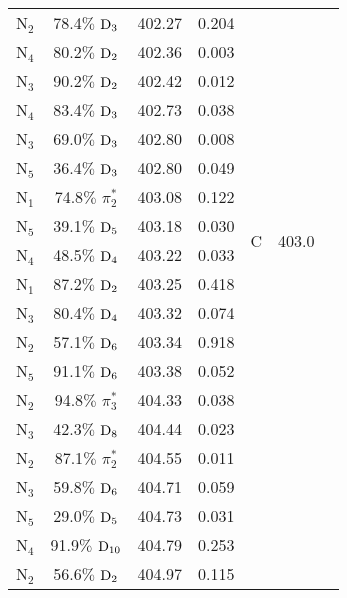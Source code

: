\documentclass[12pt]{article}
\begin{document}
\begin{table}[!h]
\begin{tabular}{c@{\hskip 0.22in}c@{\hskip 0.22in}c@{\hskip 0.22in}c@{\hskip 0.52in}c@{\hskip 0.22in}c@{\hskip 0.22in}c}
    N$_2$
 &   78.4$\%$ $\rm D_3$  & 402.27 & 0.204 \\
    N$_4$
 &   80.2$\%$ $\rm D_2$  & 402.36 & 0.003 \\
    N$_3$
 &   90.2$\%$ $\rm D_2$  & 402.42 & 0.012 
 \vspace{0.1in}\\
    N$_4$
 &   83.4$\%$ $\rm D_3$  & 402.73 & 0.038 & \multirow{10}{*}{C} & \multirow{10}{*}{403.0}\\
    N$_3$
 &   69.0$\%$ $\rm D_3$  & 402.80 & 0.008 \\
    N$_5$
 &   36.4$\%$ $\rm D_3$  & 402.80 & 0.049 \\
    N$_1$
 &   74.8$\%$ $\pi_2^*$  & 403.08 & 0.122 \\
    N$_5$
 &   39.1$\%$ $\rm D_5$  & 403.18 & 0.030 \\
    N$_4$
 &   48.5$\%$ $\rm D_4$  & 403.22 & 0.033 \\
    N$_1$
 &   87.2$\%$ $\rm D_2$  & 403.25 & 0.418 \\
    N$_3$
 &   80.4$\%$ $\rm D_4$  & 403.32 & 0.074 \\
    N$_2$
 &   57.1$\%$ $\rm D_6$  & 403.34 & 0.918 \\
    N$_5$
 &   91.1$\%$ $\rm D_6$  & 403.38 & 0.052 
 \vspace{0.1in}\\
    N$_2$
 &   94.8$\%$ $\pi_3^*$  & 404.33 & 0.038 \\
    N$_3$
 &   42.3$\%$ $\rm D_8$  & 404.44 & 0.023 \\
    N$_2$
 &   87.1$\%$ $\pi_2^*$  & 404.55 & 0.011 \\
    N$_3$
 &   59.8$\%$ $\rm D_6$  & 404.71 & 0.059 \\
    N$_5$
 &   29.0$\%$ $\rm D_5$  & 404.73 & 0.031 \\
    N$_4$
 &   91.9$\%$ $\rm D_{10}$  & 404.79 & 0.253 \\
    N$_2$
 &   56.6$\%$ $\rm D_2$  & 404.97 & 0.115 \\
 \hline
 \hline
   \end{tabular}
 \label{fig: adenine_k_nitrogen}
\end{table}
\newpage
\end{document}
